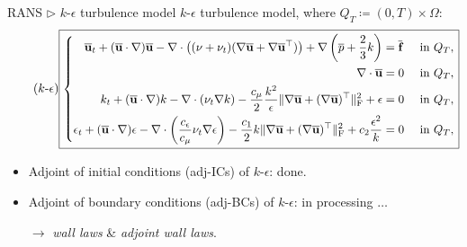 \documentclass[10pt
hyperref={
    pdfauthor={Hong Quan Ba Nguyen},
    pdftitle={Optimal Shape Design of Air Ducts in Combustion Engines: Design a General Framework},
    pdfsubject={Talk},
    pdfcreator={LaTeX},
}
]{beamer}
\begin{document}
\begin{frame}{RANS $\triangleright$ $k$-$\epsilon$ turbulence model}
    $k$-$\epsilon$ turbulence model, where $Q_T\coloneqq(0,T)\times\Omega$:
    \begin{equation}
        \label{k-epsilon}
        \tag{$k$-$\epsilon$}
        \scalebox{0.95}{%
            \boxed{\left\{\begin{split}
                \overline{\textbf{u}}_t + (\overline{\textbf{u}}\cdot\nabla)\overline{\textbf{u}} - \nabla\cdot\left((\nu + \nu_t)(\nabla \overline{\textbf{u}} + \nabla \overline{\textbf{u}}^\top)\right) + \nabla\left(\overline{p} + \frac{2}{3}k\right) &= \overline{\textbf{f}} &&\mbox{ in } Q_T,\\
                \nabla\cdot \overline{\textbf{u}} &= 0 &&\mbox{ in } Q_T,\\
                k_t + (\overline{\textbf{u}}\cdot\nabla)k - \nabla\cdot(\nu_t\nabla k) - \frac{c_\mu}{2}\frac{k^2}{\epsilon}\|\nabla\overline{\textbf{u}} + (\nabla \overline{\textbf{u}})^\top\|_{\rm F}^2 + \epsilon &= 0 &&\mbox{ in } Q_T,\\
                \epsilon_t + (\overline{\textbf{u}}\cdot\nabla)\epsilon - \nabla\cdot\left(\frac{c_\epsilon}{c_\mu}\nu_t\nabla\epsilon\right) - \frac{c_1}{2}k\|\nabla \overline{\textbf{u}} + (\nabla \overline{\textbf{u}})^\top\|_{\rm F}^2 + c_2\frac{\epsilon^2}{k} &= 0 &&\mbox{ in } Q_T,
            \end{split}\right.}}
    \end{equation}
    \begin{itemize}
        \item Adjoint of initial conditions (adj-ICs) of $k$-$\epsilon$: done.
        \item Adjoint of boundary conditions (adj-BCs) of $k$-$\epsilon$: in processing $\ldots$
        
        $\to$ \textit{wall laws} {\small\&} \textit{adjoint wall laws}.
    \end{itemize}
\end{frame}
\end{document}
